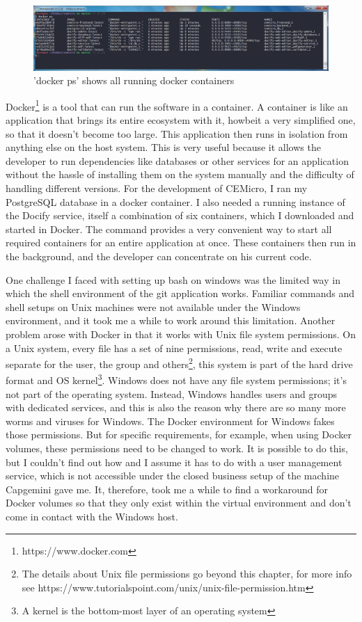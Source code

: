 \begin{figure}[ht]
  \centering
  \includegraphics[width=1\linewidth]{assets/terminal-docker-ps.png}
  \caption{'docker ps' shows all running docker containers}
\end{figure}

Docker\footnote{https://www.docker.com} is a tool that can run the software in a container. A container is like an application that brings its entire ecosystem with it, howbeit a very simplified one, so that it doesn't become too large. This application then runs in isolation from anything else on the host system. This is very useful because it allows the developer to run dependencies like databases or other services for an application without the hassle of installing them on the system manually and the difficulty of handling different versions. For the development of CEMicro, I ran my PostgreSQL database in a docker container. I also needed a running instance of the Docify service, itself a combination of six containers, which I downloaded and started in Docker. The  command provides a very convenient way to start all required containers for an entire application at once. These containers then run in the background, and the developer can concentrate on his current code.

One challenge I faced with setting up bash on windows was the limited way in which the shell environment of the git application works. Familiar commands and shell setups on Unix machines were not available under the Windows environment, and it took me a while to work around this limitation. Another problem arose with Docker in that it works with Unix file system permissions. On a Unix system, every file has a set of nine permissions, read, write and execute separate for the user, the group and others\footnote{The details about Unix file permissions go beyond this chapter, for more info see https://www.tutorialspoint.com/unix/unix-file-permission.htm}, this system is part of the hard drive format and OS kernel\footnote{A kernel is the bottom-most layer of an operating system}. Windows does not have any file system permissions; it's not part of the operating system. Instead, Windows handles users and groups with dedicated services, and this is also the reason why there are so many more worms and viruses for Windows. The Docker environment for Windows fakes those permissions. But for specific requirements, for example, when using Docker volumes, these permissions need to be changed to work. It is possible to do this, but I couldn't find out how and I assume it has to do with a user management service, which is not accessible under the closed business setup of the machine Capgemini gave me. It, therefore, took me a while to find a workaround for Docker volumes so that they only exist within the virtual environment and don't come in contact with the Windows host.

